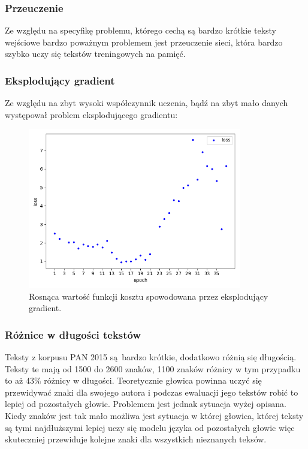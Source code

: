 \subsubsection{Przeuczenie}
Ze względu na specyfikę problemu, którego cechą są bardzo krótkie teksty wejściowe bardzo poważnym
problemem jest przeuczenie sieci, która bardzo szybko uczy się tekstów treningowych na pamięć.

\subsubsection{Eksplodujący gradient}
Ze względu na zbyt wysoki współczynnik uczenia, bądź na zbyt mało danych występował problem eksplodującego
gradientu:
\begin{figure}[H]
	\centering
	\includegraphics[height=7cm]{./images/exploading_gradient.png}
	\caption{Rosnąca wartość funkcji kosztu spowodowana przez eksplodujący gradient.}
	\label{fig:test5}
\end{figure}

\subsubsection{Różnice w długości tekstów}
Teksty z korpusu PAN 2015 \cite{pan} są bardzo krótkie, dodatkowo różnią się długością. Teksty te mają od 1500 do 2600 znaków, 1100 znaków
różnicy w tym przypadku to aż $43\%$ różnicy w długości. Teoretycznie głowica powinna uczyć się przewidywać znaki dla
swojego autora i podczas ewaluacji jego tekstów robić to lepiej od pozostałych głowic. Problemem jest
 jednak sytuacja wyżej opisana. Kiedy znaków jest tak mało
możliwa jest sytuacja w której głowica, której teksty są tymi najdłuższymi lepiej uczy się modelu języka od
pozostałych głowic więc skuteczniej przewiduje kolejne znaki dla wszystkich nieznanych teksów.

